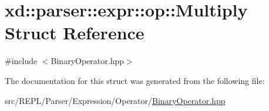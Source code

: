 \hypertarget{structxd_1_1parser_1_1expr_1_1op_1_1_multiply}{}\section{xd\+:\+:parser\+:\+:expr\+:\+:op\+:\+:Multiply Struct Reference}
\label{structxd_1_1parser_1_1expr_1_1op_1_1_multiply}


{\ttfamily \#include $<$Binary\+Operator.\+hpp$>$}



The documentation for this struct was generated from the following file\+:\begin{DoxyCompactItemize}
\item 
src/\+R\+E\+P\+L/\+Parser/\+Expression/\+Operator/\mbox{\hyperlink{_binary_operator_8hpp}{Binary\+Operator.\+hpp}}\end{DoxyCompactItemize}
